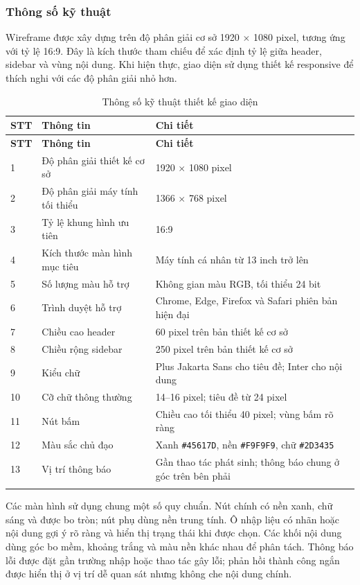 \documentclass[../DoAn.tex]{subfiles}
\begin{document}
\subsubsection{Thông số kỹ thuật}

Wireframe được xây dựng trên độ phân giải cơ sở 1920 $\times$ 1080 pixel, tương ứng với tỷ lệ 16:9. Đây là kích thước tham chiếu để xác định tỷ lệ giữa header, sidebar và vùng nội dung. Khi hiện thực, giao diện sử dụng thiết kế responsive để thích nghi với các độ phân giải nhỏ hơn.

\begin{longtable}{|p{1.2cm}|p{5.2cm}|p{7cm}|}
\hline
\textbf{STT} & \textbf{Thông tin} & \textbf{Chi tiết} \\
\hline
\endfirsthead
\hline
\textbf{STT} & \textbf{Thông tin} & \textbf{Chi tiết} \\
\hline
\endhead
1 & Độ phân giải thiết kế cơ sở & 1920 $\times$ 1080 pixel \\
\hline
2 & Độ phân giải máy tính tối thiểu & 1366 $\times$ 768 pixel \\
\hline
3 & Tỷ lệ khung hình ưu tiên & 16:9 \\
\hline
4 & Kích thước màn hình mục tiêu & Máy tính cá nhân từ 13 inch trở lên \\
\hline
5 & Số lượng màu hỗ trợ & Không gian màu RGB, tối thiểu 24 bit \\
\hline
6 & Trình duyệt hỗ trợ & Chrome, Edge, Firefox và Safari phiên bản hiện đại \\
\hline
7 & Chiều cao header & 60 pixel trên bản thiết kế cơ sở \\
\hline
8 & Chiều rộng sidebar & 250 pixel trên bản thiết kế cơ sở \\
\hline
9 & Kiểu chữ & Plus Jakarta Sans cho tiêu đề; Inter cho nội dung \\
\hline
10 & Cỡ chữ thông thường & 14--16 pixel; tiêu đề từ 24 pixel \\
\hline
11 & Nút bấm & Chiều cao tối thiểu 40 pixel; vùng bấm rõ ràng \\
\hline
12 & Màu sắc chủ đạo & Xanh \texttt{\#45617D}, nền \texttt{\#F9F9F9}, chữ \texttt{\#2D3435} \\
\hline
13 & Vị trí thông báo & Gần thao tác phát sinh; thông báo chung ở góc trên bên phải \\
\hline
\caption{Thông số kỹ thuật thiết kế giao diện}
\label{table:4.1}\\
\end{longtable}

Các màn hình sử dụng chung một số quy chuẩn. Nút chính có nền xanh, chữ sáng và được bo tròn; nút phụ dùng nền trung tính. Ô nhập liệu có nhãn hoặc nội dung gợi ý rõ ràng và hiển thị trạng thái khi được chọn. Các khối nội dung dùng góc bo mềm, khoảng trắng và màu nền khác nhau để phân tách. Thông báo lỗi được đặt gần trường nhập hoặc thao tác gây lỗi; phản hồi thành công ngắn được hiển thị ở vị trí dễ quan sát nhưng không che nội dung chính.
\end{document}
